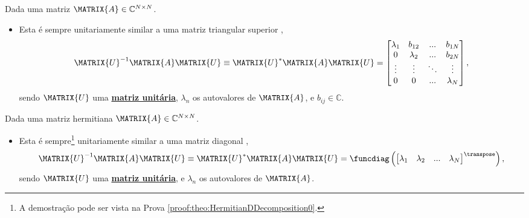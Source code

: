 \begin{theorem}\label{theo:ShurDecomposition0}
Dada uma matriz $\MATRIX{A} \in \mathbb{C}^{N \times N}$.
\begin{itemize}
\item Esta é sempre  unitariamente similar a uma matriz triangular superior 
\cite[pp. 59]{axelsson1996iterative} \cite[pp. 351]{golub2013matrix},
\begin{equation}
\MATRIX{U}^{-1} \MATRIX{A} \MATRIX{U} \equiv
\MATRIX{U}^{\ast} \MATRIX{A} \MATRIX{U} =
\begin{bmatrix}
\lambda_1 & b_{12}    & ...    & b_{1N} \\
0         & \lambda_2 & ...    & b_{2N} \\
\vdots    & \vdots    & \ddots & \vdots \\
0         & 0         & ...    & \lambda_N
\end{bmatrix},
\end{equation}
sendo $\MATRIX{U}$ uma \hyperref[def:unitarymatrix0]{\textbf{matriz unitária}},
$\lambda_n$ os autovalores de $\MATRIX{A}$, e $b_{ij}\in \mathbb{C}$.
\end{itemize}
\end{theorem}

\begin{theorem}\label{theo:HermitianDDecomposition0}
Dada uma matriz hermitiana $\MATRIX{A} \in \mathbb{C}^{N \times N}$.
\begin{itemize}
\item Esta é sempre\footnote{A
demostração pode ser vista na Prova \ref{proof:theo:HermitianDDecomposition0}.}  
unitariamente similar a uma matriz diagonal
\cite[pp. 60]{axelsson1996iterative},
\begin{equation}
\MATRIX{U}^{-1} \MATRIX{A} \MATRIX{U} \equiv
\MATRIX{U}^{\ast} \MATRIX{A} \MATRIX{U} =
\funcdiag\left(
\begin{bmatrix}
\lambda_1 & \lambda_2 & ...    & \lambda_N \\
\end{bmatrix}^{\transpose}\right),
\end{equation}
sendo $\MATRIX{U}$ uma \hyperref[def:unitarymatrix0]{\textbf{matriz unitária}}, e
$\lambda_n$ os autovalores de $\MATRIX{A}$.
\end{itemize}
\end{theorem}

